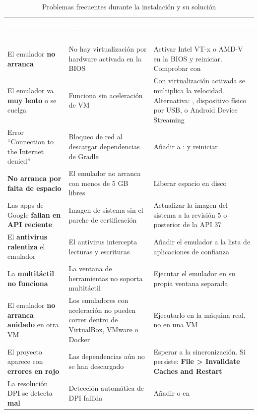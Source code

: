 \begin{xltabular}{\textwidth}{@{}>{\RaggedRight\arraybackslash}p{3.3cm} >{\RaggedRight\arraybackslash}p{4.5cm} >{\RaggedRight\arraybackslash}X@{}}
\caption{Problemas frecuentes durante la instalación y su solución}\label{tab:problemas}\\
\toprule
{}
\textcolor{white}{\sffamily\bfseries Problema} & \textcolor{white}{\sffamily\bfseries Causa} & \textcolor{white}{\sffamily\bfseries Solución} \\
\midrule
\endfirsthead
\toprule
{}
\textcolor{white}{\sffamily\bfseries Problema} & \textcolor{white}{\sffamily\bfseries Causa} & \textcolor{white}{\sffamily\bfseries Solución} \\
\midrule
\endhead
\bottomrule
\endlastfoot
El emulador \textbf{no arranca} & No hay virtualización por hardware activada en la BIOS & Activar Intel VT-x o AMD-V en la BIOS y reiniciar. Comprobar con  \\
El emulador va \textbf{muy lento} o se cuelga & Funciona sin aceleración de VM & Con virtualización activada se multiplica la velocidad. Alternativa: , dispositivo físico por USB, o Android Device Streaming \\
Error \enquote{Connection to the Internet denied} & Bloqueo de red al descargar dependencias de Gradle & Añadir a :  y reiniciar \\
\textbf{No arranca por falta de espacio} & El emulador no arranca con menos de 5 GB libres & Liberar espacio en disco \\
Las apps de Google \textbf{fallan en API reciente} & Imagen de sistema sin el parche de certificación & Actualizar la imagen del sistema a la revisión 5 o posterior de la API 37 \\
El \textbf{antivirus ralentiza} el emulador & El antivirus intercepta lecturas y escrituras & Añadir el emulador a la lista de aplicaciones de confianza \\
La \textbf{multitáctil no funciona} & La ventana de herramientas no soporta multitáctil & Ejecutar el emulador en su propia ventana separada \\
El emulador \textbf{no arranca anidado} en otra VM & Los emuladores con aceleración no pueden correr dentro de VirtualBox, VMware o Docker & Ejecutarlo en la máquina real, no en una VM \\
El proyecto aparece con \textbf{errores en rojo} & Las dependencias aún no se han descargado & Esperar a la sincronización. Si persiste: \textbf{File > Invalidate Caches and Restart} \\
La resolución DPI se detecta \textbf{mal} & Detección automática de DPI fallida & Añadir  o  en  \\
\end{xltabular}

